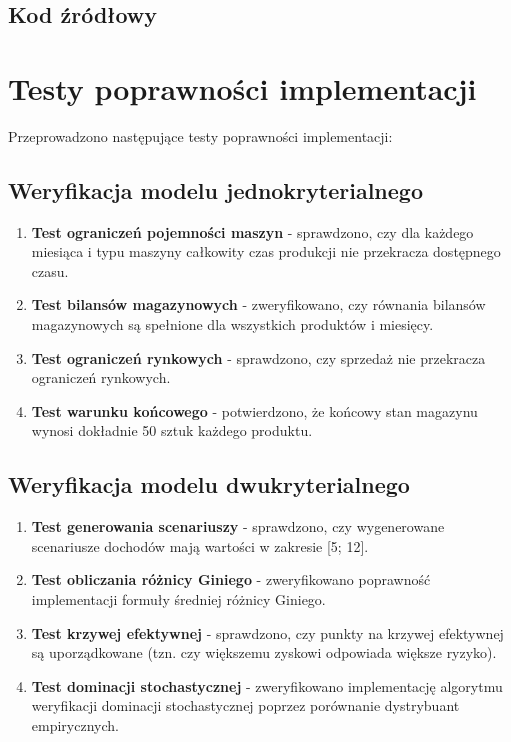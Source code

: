 \documentclass[12pt]{article}
\begin{document}
\subsection{Kod źródłowy}



\section{Testy poprawności implementacji}

Przeprowadzono następujące testy poprawności implementacji:

\subsection{Weryfikacja modelu jednokryterialnego}
\begin{enumerate}
  \item \textbf{Test ograniczeń pojemności maszyn} - sprawdzono, czy dla każdego miesiąca i typu maszyny całkowity czas produkcji nie przekracza dostępnego czasu.
  \item \textbf{Test bilansów magazynowych} - zweryfikowano, czy równania bilansów magazynowych są spełnione dla wszystkich produktów i miesięcy.
  \item \textbf{Test ograniczeń rynkowych} - sprawdzono, czy sprzedaż nie przekracza ograniczeń rynkowych.
  \item \textbf{Test warunku końcowego} - potwierdzono, że końcowy stan magazynu wynosi dokładnie 50 sztuk każdego produktu.
\end{enumerate}

\subsection{Weryfikacja modelu dwukryterialnego}
\begin{enumerate}
  \item \textbf{Test generowania scenariuszy} - sprawdzono, czy wygenerowane scenariusze dochodów mają wartości w zakresie [5; 12].
  \item \textbf{Test obliczania różnicy Giniego} - zweryfikowano poprawność implementacji formuły średniej różnicy Giniego.
  \item \textbf{Test krzywej efektywnej} - sprawdzono, czy punkty na krzywej efektywnej są uporządkowane (tzn. czy większemu zyskowi odpowiada większe ryzyko).
  \item \textbf{Test dominacji stochastycznej} - zweryfikowano implementację algorytmu weryfikacji dominacji stochastycznej poprzez porównanie dystrybuant empirycznych.
\end{enumerate}
\end{document}
